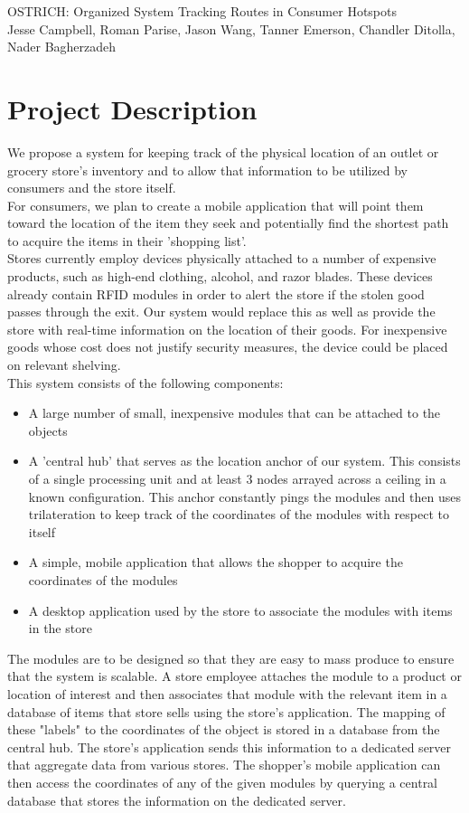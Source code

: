\documentclass{article}
\begin{document}
\begin{center}
{\Large OSTRICH: Organized System Tracking Routes in Consumer Hotspots} \\
{\small Jesse Campbell, Roman Parise, Jason Wang, Tanner Emerson, Chandler Ditolla, Nader Bagherzadeh}
\end{center}
\section{Project Description}
We propose a system for keeping track of the physical location of an outlet or grocery store's inventory and to allow that information to be utilized by consumers and the store itself. \\

For consumers, we plan to create a mobile application that will point them toward the location of the item they seek and potentially find the shortest path to acquire the items in their 'shopping list'. \\

Stores currently employ devices physically attached to a number of expensive products, such as high-end clothing, alcohol, and razor blades. These devices already contain RFID modules in order to alert the store if the stolen good passes through the exit. Our system would replace this as well as provide the store with real-time information on the location of their goods. For inexpensive goods whose cost does not justify security measures, the device could be placed on relevant shelving.\\

This system consists of the following components:
\begin{itemize}
\item A large number of small, inexpensive modules that can be attached to the objects
\item A 'central hub' that serves as the location anchor of our system. This consists of a single processing unit and at least $3$ nodes arrayed across a ceiling in a known configuration. This anchor constantly pings the modules and then uses trilateration to keep track of the coordinates of the modules with respect to itself
\item A simple, mobile application that allows the shopper to acquire the coordinates of the modules
\item A desktop application used by the store to associate the modules with items in the store
\end{itemize}
The modules are to be designed so that they are easy to mass produce to ensure that the system is scalable.
A store employee attaches the module to a product or location of interest and then associates that module with the relevant item in a database of items that store sells using the store's application.
The mapping of these "labels" to the coordinates of the object is stored in a database from the central hub.
The store's application sends this information to a dedicated server that aggregate data from various stores.
The shopper's mobile application can then access the coordinates of any of the given modules by querying a central database that stores the information on the dedicated server.
\end{document}
